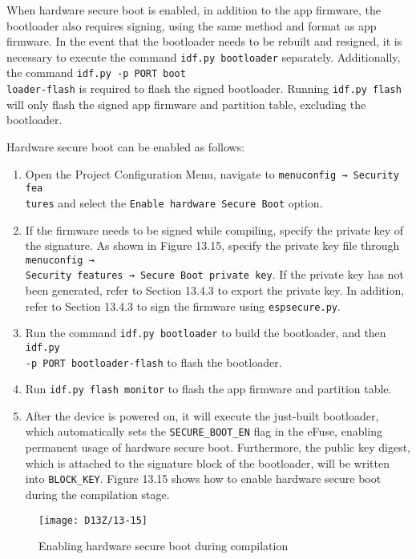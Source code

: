 \documentclass[a4paper,12pt]{book}
\begin{document}
When hardware secure boot is enabled, in addition to the app firmware, the bootloader also requires signing, using the same method and format as app firmware. In the event that the bootloader needs to be rebuilt and resigned, it is necessary to execute the command \verb|idf.py bootloader| separately. Additionally, the command \verb|idf.py -p PORT boot|\\ \verb|loader-flash| is required to flash the signed bootloader. Running \verb|idf.py flash| will only flash the signed app firmware and partition table, excluding the bootloader.

Hardware secure boot can be enabled as follows: 

\begin{enumerate}[label=(\arabic*)]
    \item Open the Project Configuration Menu, navigate to \verb|menuconfig → Security fea|\\ \verb|tures| and select the \verb|Enable hardware Secure Boot| option.
    \item If the firmware needs to be signed while compiling, specify the private key of the signature. As shown in Figure 13.15, specify the private key file through \verb|menuconfig → |\\ \verb|Security features → Secure Boot private key|. If the private key has not been generated, refer to Section 13.4.3 to export the private key. In addition, refer to Section 13.4.3 to sign the firmware using \verb|espsecure.py|.
    \item Run the command \verb|idf.py bootloader| to build the bootloader, and then \verb|idf.py |\\ \verb|-p PORT bootloader-flash| to flash the bootloader.
    \item Run \verb|idf.py flash monitor| to flash the app firmware and partition table.
    \item After the device is powered on, it will execute the just-built bootloader, which automatically sets the \verb|SECURE_BOOT_EN| flag in the eFuse, enabling permanent usage of hardware secure boot. Furthermore, the public key digest, which is attached to the signature block of the bootloader, will be written into \verb|BLOCK_KEY|. Figure 13.15 shows how to enable hardware secure boot during the compilation stage.
\end{enumerate}

\begin{figure}[!h]
    \centering
    \texttt{[image: D13Z/13-15]}
    \caption{Enabling hardware secure boot during compilation}
\end{figure}
\end{document}
